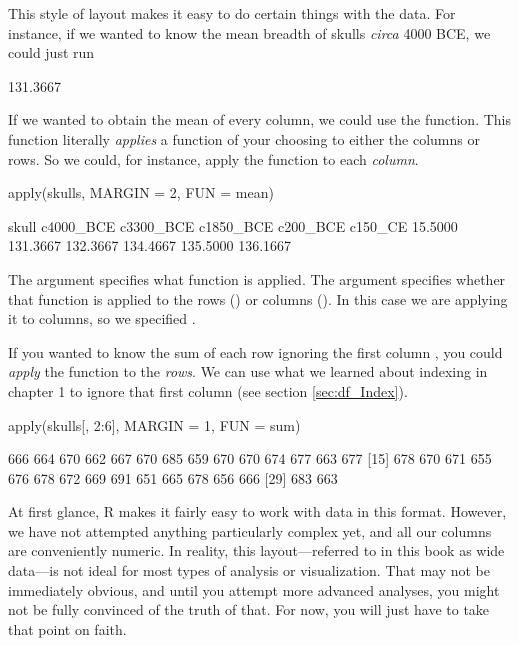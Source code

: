 This style of layout makes it easy to do certain things with the data. For instance, if we wanted to know the mean breadth of skulls \textit{circa} 4000 BCE, we could just run 


\begin{outR}
[1] 131.3667
\end{outR}

If we wanted to obtain the mean of every column, we could use the  function. This function literally \textit{applies} a function of your choosing to either the columns or rows. So we could, for instance, apply the  function to each \textit{column}.

\begin{inR}
apply(skulls, MARGIN = 2, FUN = mean)
\end{inR}

\begin{outR}
    skull c4000_BCE c3300_BCE c1850_BCE  c200_BCE   c150_CE 
  15.5000  131.3667  132.3667  134.4667  135.5000  136.1667 
\end{outR}

\noindent
The argument  specifies what function is applied. The argument  specifies whether that function is applied to the rows () or columns (). In this case we are applying it to columns, so we specified .

If you wanted to know the sum of each row ignoring the first column , you could \textit{apply} the  function to the \textit{rows}. We can use what we learned about indexing in chapter 1 to ignore that first column (see section \ref{sec:df_Index}).

\begin{inR}
apply(skulls[, 2:6], MARGIN = 1, FUN = sum)
\end{inR}

\begin{outR}
 [1] 666 664 670 662 667 670 685 659 670 670 674 677 663 677
[15] 678 670 671 655 676 678 672 669 691 651 665 678 656 666
[29] 683 663
\end{outR}

At first glance, R makes it fairly easy to work with data in this format. However, we have not attempted anything particularly complex yet, and all our columns are conveniently numeric. In reality, this layout—referred to in this book as \gls{wide data}—is not ideal for most types of analysis or visualization. That may not be immediately obvious, and until you attempt more advanced analyses, you might not be fully convinced of the truth of that. For now, you will just have to take that point on faith. 

